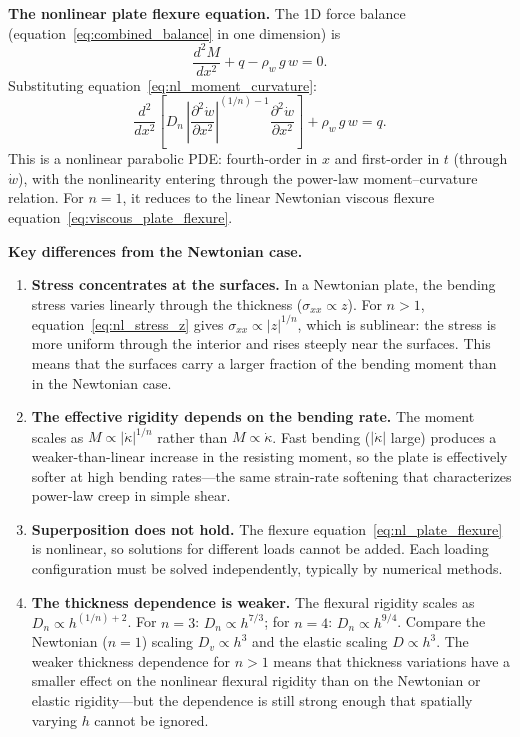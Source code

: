 \documentclass[11pt]{article}
\begin{document}
\medskip
\noindent\textbf{The nonlinear plate flexure equation.}  The 1D force balance (equation~\eqref{eq:combined_balance} in one dimension) is
\begin{equation}
  \frac{d^2 M}{dx^2} + q - \rho_w\,g\,w = 0.
  \label{eq:1d_force_balance}
\end{equation}
Substituting equation~\eqref{eq:nl_moment_curvature}:
\begin{equation}
  \boxed{\frac{d^2}{dx^2}\!\left[D_n\,\left|\frac{\partial^2 \dot{w}}{\partial x^2}\right|^{(1/n)-1}\frac{\partial^2 \dot{w}}{\partial x^2}\right] + \rho_w\,g\,w = q.}
  \label{eq:nl_plate_flexure}
\end{equation}
This is a nonlinear parabolic PDE: fourth-order in $x$ and first-order in $t$ (through $\dot{w}$), with the nonlinearity entering through the power-law moment--curvature relation.  For $n = 1$, it reduces to the linear Newtonian viscous flexure equation~\eqref{eq:viscous_plate_flexure}.

\medskip
\noindent\textbf{Key differences from the Newtonian case.}
\begin{enumerate}
  \item \textbf{Stress concentrates at the surfaces.}  In a Newtonian plate, the bending stress varies linearly through the thickness ($\sigma_{xx} \propto z$).  For $n > 1$, equation~\eqref{eq:nl_stress_z} gives $\sigma_{xx} \propto |z|^{1/n}$, which is sublinear: the stress is more uniform through the interior and rises steeply near the surfaces.  This means that the surfaces carry a larger fraction of the bending moment than in the Newtonian case.

  \item \textbf{The effective rigidity depends on the bending rate.}  The moment scales as $M \propto |\dot{\kappa}|^{1/n}$ rather than $M \propto \dot{\kappa}$.  Fast bending ($|\dot{\kappa}|$ large) produces a weaker-than-linear increase in the resisting moment, so the plate is effectively softer at high bending rates---the same strain-rate softening that characterizes power-law creep in simple shear.

  \item \textbf{Superposition does not hold.}  The flexure equation~\eqref{eq:nl_plate_flexure} is nonlinear, so solutions for different loads cannot be added.  Each loading configuration must be solved independently, typically by numerical methods.

  \item \textbf{The thickness dependence is weaker.}  The flexural rigidity scales as $D_n \propto h^{(1/n)+2}$.  For $n = 3$: $D_n \propto h^{7/3}$; for $n = 4$: $D_n \propto h^{9/4}$.  Compare the Newtonian ($n = 1$) scaling $D_v \propto h^3$ and the elastic scaling $D \propto h^3$.  The weaker thickness dependence for $n > 1$ means that thickness variations have a smaller effect on the nonlinear flexural rigidity than on the Newtonian or elastic rigidity---but the dependence is still strong enough that spatially varying $h$ cannot be ignored.
\end{enumerate}
\end{document}
